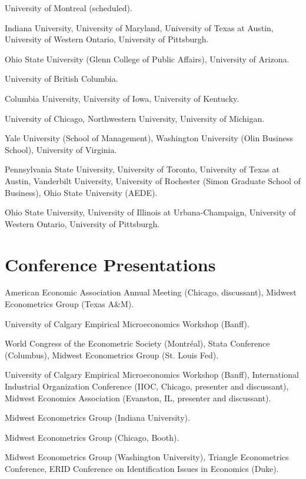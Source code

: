 \documentclass[10pt,letterpaper]{article}
\begin{document}
\begin{description}[font=\mdseries]
\item[2018]
  University of Montreal (scheduled).
\item[2017]
  Indiana University,
  University of Maryland,
  University of Texas at Austin,
  University of Western Ontario,
  University of Pittsburgh.
\item[2016]
  Ohio State University (Glenn College of Public Affairs),
  University of Arizona.
\item[2015]
  University of British Columbia.
\item[2014]
  Columbia University,
  University of Iowa,
  University of Kentucky.
\item[2013]
  University of Chicago,
  Northwestern University,
  University of Michigan.
\item[2012]
  Yale University (School of Management),
  Washington University (Olin Business School),
  University of Virginia.
\item[2011]
  Pennsylvania State University,
  University of Toronto,
  University of Texas at Austin,
  Vanderbilt University,
  University of Rochester (Simon Graduate School of Business),
  Ohio State University (AEDE).
\item[2010]
  Ohio State University,
  University of Illinois at Urbana-Champaign,
  University of Western Ontario,
  University of Pittsburgh.
\end{description}

\section*{Conference Presentations}

\begin{description}[font=\mdseries]
\item[2017]
  American Economic Association Annual Meeting (Chicago, discussant),
  Midwest Econometrics Group (Texas A\&M).
\item[2016]
  University of Calgary Empirical Microeconomics Workshop (Banff).
\item[2015]
  World Congress of the Econometric Society (Montr\'{e}al),
  Stata Conference (Columbus),
  Midwest Econometrics Group (St. Louis Fed).
\item[2014]
  University of Calgary Empirical Microeconomics Workshop (Banff),
  International Industrial Organization Conference (IIOC, Chicago, presenter and discussant),
  Midwest Economics Association (Evanston, IL, presenter and discussant).
\item[2013]
  Midwest Econometrics Group (Indiana University).
\item[2011]
  Midwest Econometrics Group (Chicago, Booth).
\item[2010]
  Midwest Econometrics Group (Washington University),
  Triangle Econometrics Conference,
  ERID Conference on Identification Issues in Economics (Duke).
\end{description}
\end{document}
